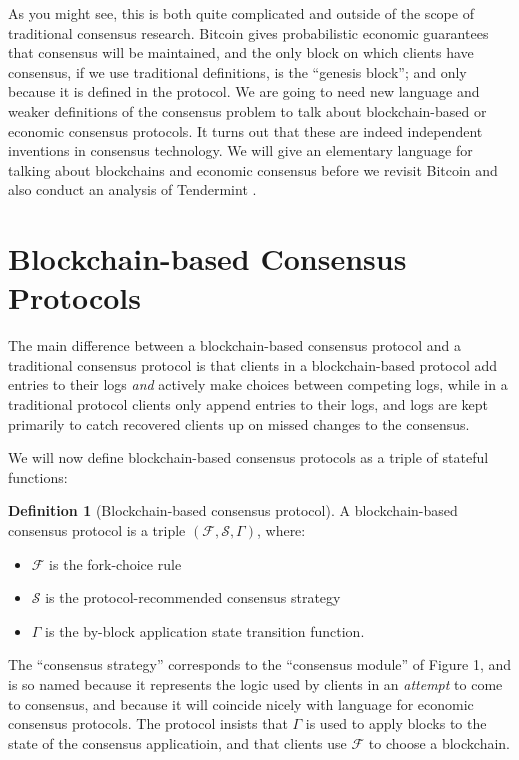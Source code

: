 \documentclass[11pt,a4paper]{article}
\theoremstyle{plain}
\theoremstyle{definition}
\newtheorem{defn}{Definition}
\begin{document}
As you might see, this is both quite complicated and outside of the scope of traditional consensus research. Bitcoin gives probabilistic economic guarantees that consensus will be maintained, and the only block on which clients have consensus, if we use traditional definitions, is the ``genesis block''; and only because it is defined in the protocol. We are going to need new language and weaker definitions of the consensus problem to talk about blockchain-based or economic consensus protocols. It turns out that these are indeed independent inventions in consensus technology. We will give an elementary language for talking about blockchains and economic consensus before we revisit Bitcoin and also conduct an analysis of Tendermint \cite{Tendermint}.

\section{Blockchain-based Consensus Protocols}

The main difference between a blockchain-based consensus protocol and a traditional consensus protocol is that clients in a blockchain-based protocol add entries to their logs \emph{and} actively make choices between competing logs, while in a traditional protocol clients only append entries to their logs, and logs are kept primarily to catch recovered clients up on missed changes to the consensus. 

We will now define blockchain-based consensus protocols as a triple of stateful functions:

\begin{defn}[Blockchain-based consensus protocol]
A blockchain-based consensus protocol is a triple $(\mathcal{F}, \mathcal{S}, \Gamma)$, where:
\begin{itemize}
\item $\mathcal{F}$ is the fork-choice rule
\item $\mathcal{S}$ is the protocol-recommended consensus strategy
\item $\Gamma$ is the by-block application state transition function.
\end{itemize}
\end{defn}

The ``consensus strategy'' corresponds to the ``consensus module'' of Figure 1, and is so named because it represents the logic used by clients in an \emph{attempt} to come to consensus, and because it will coincide nicely with language for economic consensus protocols. The protocol insists that $\Gamma$ is used to apply blocks to the state of the consensus applicatioin, and that clients use $\mathcal{F}$ to choose a blockchain. 
\end{document}
